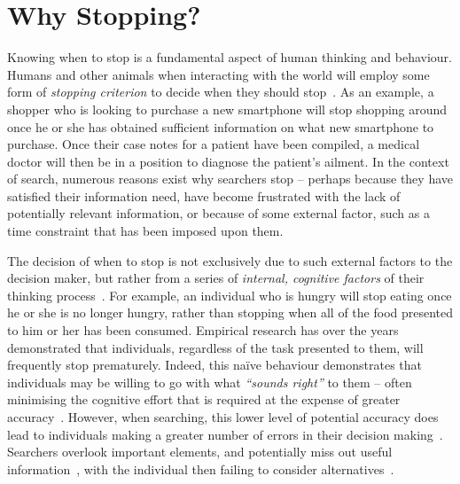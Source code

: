 \section{Why Stopping?}\label{sec:stopping_background:why}
Knowing when to stop is a fundamental aspect of human thinking and behaviour. Humans and other animals when interacting with the world will employ some form of \emph{stopping criterion} to decide when they should stop~\citep{nickles1995judgment}. As an example, a shopper who is looking to purchase a new smartphone will stop shopping around once he or she has obtained sufficient information on what new smartphone to purchase. Once their case notes for a patient have been compiled, a medical doctor will then be in a position to diagnose the patient's ailment. In the context of search, numerous reasons exist why searchers stop -- perhaps because they have satisfied their information need, have become frustrated with the lack of potentially relevant information, or because of some external factor, such as a time constraint that has been imposed upon them.

The decision of when to stop is not exclusively due to such external factors to the decision maker, but rather from a series of \emph{internal, cognitive factors} of their thinking process~\citep{nickles1995judgment}. For example, an individual who is hungry will stop eating once he or she is no longer hungry, rather than stopping when all of the food presented to him or her has been consumed. Empirical research has over the years demonstrated that individuals, regardless of the task presented to them, will frequently stop prematurely. Indeed, this na\"{i}ve behaviour demonstrates that individuals may be willing to go with what \emph{``sounds right''} to them -- often minimising the cognitive effort that is required at the expense of greater accuracy~\citep{perkins1983difficulties}. However, when searching, this lower level of potential accuracy does lead to individuals making a greater number of errors in their decision making~\citep{baron1988heuristics}. Searchers overlook important elements, and potentially miss out useful information~\citep{fischhoff1977cost_benefit, fischhoff1978fault, shafir1992thinking}, with the individual then failing to consider alternatives~\citep{farquhar1993decision_structuring}.

